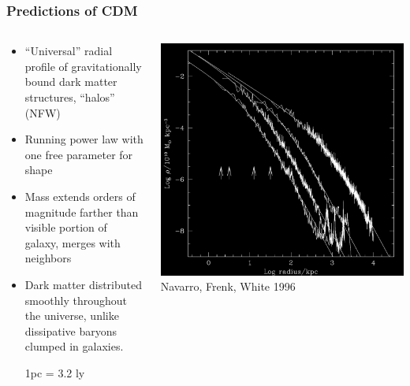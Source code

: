 \documentclass{beamer}
\begin{document}
\frame
{
    \frametitle{Predictions of CDM}

    \fontsize{9}{0.8\baselineskip}
    \begin{columns}
        \begin{column}{0.5\textwidth}    
            \begin{itemize}

                \item  ``Universal'' radial profile of gravitationally bound dark matter
                    structures, ``halos'' {\color{gold} (NFW)}

                        \item Running power law with one free parameter for shape

                        \item Mass extends orders of magnitude farther than visible portion of galaxy,
                            merges with neighbors

                \item  Dark matter distributed smoothly throughout the
                    universe, unlike dissipative baryons clumped in galaxies.

                {\color{gold} {\tiny 1pc = 3.2 ly}}

            \end{itemize}
        \end{column}
        \begin{column}{0.5\textwidth}
            \begin{center}
                \includegraphics[width=\textwidth]{nfw.png}
                \newline
                {\tiny Navarro, Frenk, White 1996}
            \end{center}
        \end{column}
    \end{columns}
}
\end{document}
